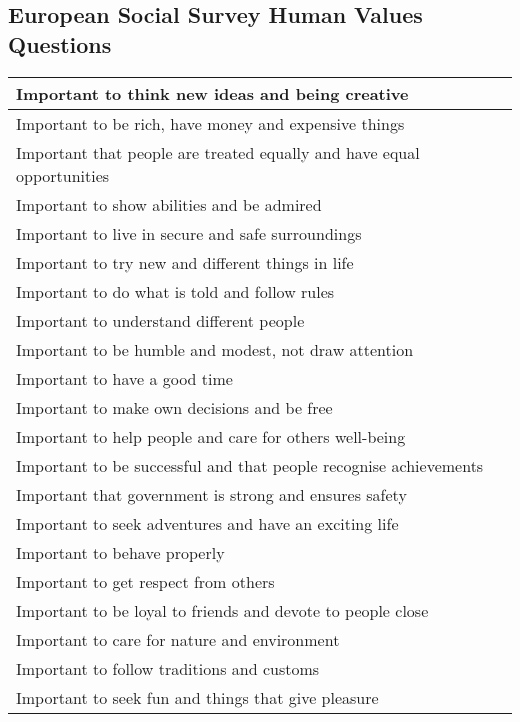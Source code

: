 \begin{table*}[p]
\section{European Social Survey Human Values Questions}
\centering
    \begin{tabular}{|p{11.0cm}|}
        \hline
     Important to think new ideas and being creative \\\hline
     Important to be rich, have money and expensive things \\\hline
     Important that people are treated equally and have equal opportunities \\\hline
     Important to show abilities and be admired \\\hline
     Important to live in secure and safe surroundings \\\hline
     Important to try new and different things in life \\\hline
     Important to do what is told and follow rules \\\hline
     Important to understand different people \\\hline
     Important to be humble and modest, not draw attention \\\hline
     Important to have a good time \\\hline
     Important to make own decisions and be free \\\hline
     Important to help people and care for others well-being \\\hline
     Important to be successful and that people recognise achievements \\\hline
     Important that government is strong and ensures safety \\\hline
     Important to seek adventures and have an exciting life \\\hline
     Important to behave properly \\\hline
     Important to get respect from others \\\hline
     Important to be loyal to friends and devote to people close \\\hline
     Important to care for nature and environment \\\hline
     Important to follow traditions and customs \\\hline
     Important to seek fun and things that give pleasure \\ \hline
\end{tabular}
\end{table*}
